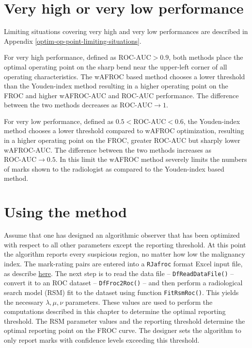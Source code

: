 \documentclass[
]{book}
\begin{document}
\hypertarget{optim-op-point-vary-nu-limiting-situations}{%
\section{Very high or very low performance}\label{optim-op-point-vary-nu-limiting-situations}}

Limiting situations covering very high and very low performances are described in Appendix \ref{optim-op-point-limiting-situations}.

For very high performance, defined as \(\text{ROC-AUC} > 0.9\), both methods place the optimal operating point on the sharp bend near the upper-left corner of all operating characteristics. The wAFROC based method chooses a lower threshold than the Youden-index method resulting in a higher operating point on the FROC and higher wAFROC-AUC and ROC-AUC performance. The difference between the two methods decreases as \(\text{ROC-AUC} \rightarrow 1\).

For very low performance, defined as \(0.5 < \text{ROC-AUC} < 0.6\), the Youden-index method chooses a lower threshold compared to wAFROC optimization, resulting in a higher operating point on the FROC, greater ROC-AUC but sharply lower wAFROC-AUC. The difference between the two methods increases as \(\text{ROC-AUC} \rightarrow 0.5\). In this limit the wAFROC method severely limits the numbers of marks shown to the radiologist as compared to the Youden-index based method.

\hypertarget{optim-op-point-how-to-use-method}{%
\section{Using the method}\label{optim-op-point-how-to-use-method}}

Assume that one has designed an algorithmic observer that has been optimized with respect to all other parameters except the reporting threshold. At this point the algorithm reports every suspicious region, no matter how low the malignancy index. The mark-rating pairs are entered into a \texttt{RJafroc} format Excel input file, as describe \href{https://dpc10ster.github.io/RJafrocQuickStart/quick-start-froc-data-format.html}{here}. The next step is to read the data file -- \texttt{DfReadDataFile()} -- convert it to an ROC dataset -- \texttt{DfFroc2Roc()} -- and then perform a radiological search model (RSM) fit to the dataset using function \texttt{FitRsmRoc()}. This yields the necessary \(\lambda, \mu, \nu\) parameters. These values are used to perform the computations described in this chapter to determine the optimal reporting threshold. The RSM parameter values and the reporting threshold determine the optimal reporting point on the FROC curve. The designer sets the algorithm to only report marks with confidence levels exceeding this threshold.
\end{document}
